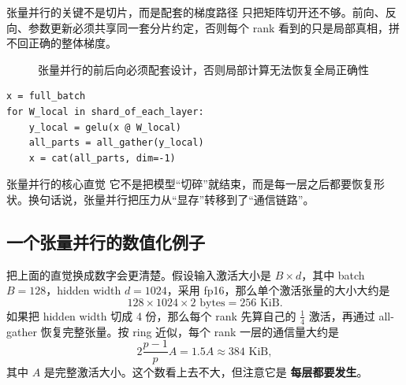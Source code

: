 \begin{importantbox}{张量并行的关键不是切片，而是配套的梯度路径}
只把矩阵切开还不够。前向、反向、参数更新必须共享同一套分片约定，否则每个 rank 看到的只是局部真相，拼不回正确的整体梯度。
\end{importantbox}

\begin{figure}[H]
\centering
{}
\caption{张量并行的前后向必须配套设计，否则局部计算无法恢复全局正确性}
\end{figure}

\begin{lstlisting}[caption={张量并行的极简理解},label={lst:tp}]
x = full_batch
for W_local in shard_of_each_layer:
    y_local = gelu(x @ W_local)
    all_parts = all_gather(y_local)
    x = cat(all_parts, dim=-1)
\end{lstlisting}

\begin{knowledgebox}{张量并行的核心直觉}
它不是把模型“切碎”就结束，而是每一层之后都要恢复形状。换句话说，张量并行把压力从“显存”转移到了“通信链路”。
\end{knowledgebox}

\subsection{一个张量并行的数值化例子}

把上面的直觉换成数字会更清楚。假设输入激活大小是 $B \times d$，其中 batch $B=128$，hidden width $d=1024$，采用 fp16，那么单个激活张量的大小大约是
\[
128 \times 1024 \times 2 \text{ bytes} = 256 \text{ KiB}.
\]
如果把 hidden width 切成 4 份，那么每个 rank 先算自己的 $\frac{1}{4}$ 激活，再通过 all-gather 恢复完整张量。按 ring 近似，每个 rank 一层的通信量大约是
\[
2\frac{p-1}{p}A = 1.5A \approx 384 \text{ KiB},
\]
其中 $A$ 是完整激活大小。这个数看上去不大，但注意它是 \textbf{每层都要发生}。

